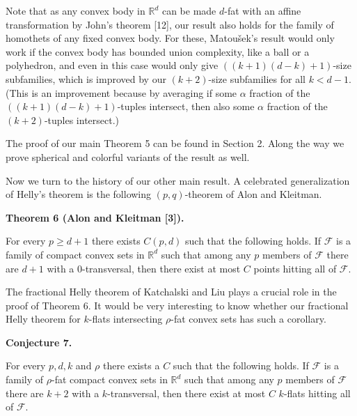 \documentclass[10pt,a4paper]{amsart}
\begin{document}
\par
\par
Note that as any convex body in $\mathbb{R}^{d}$ can be made $d$-fat with an affine transformation by John’s theorem [12], our result also holds for the family of homothets of any fixed convex body. For these, Matoušek’s result would only work if the convex body has bounded union complexity, like a ball or a polyhedron, and even in this case would only give $((k+1)(d-k)+1)$-size subfamilies, which is improved by our $(k+2)$-size subfamilies for all $k<d-1$. (This is an improvement because by averaging if some $\alpha$ fraction of the $((k+1)(d-k)+1)$-tuples intersect, then also some $\alpha$ fraction of the $(k+2)$-tuples intersect.)
\par
\par
The proof of our main Theorem 5 can be found in Section 2. Along the way we prove spherical and colorful variants of the result as well.
\par
\par
Now we turn to the history of our other main result. A celebrated generalization of Helly’s theorem is the following $(p,q)$-theorem of Alon and Kleitman.
\par
\par
\par\medskip\noindent\textbf{Theorem 6 (Alon and Kleitman [3]).}\par
For every $p\geq d+1$ there exists $C(p,d)$ such that the following holds. If $\mathcal{F}$ is a family of compact convex sets in $\mathbb{R}^{d}$ such that among any $p$ members of $\mathcal{F}$ there are $d+1$ with a $0$-transversal, then there exist at most $C$ points hitting all of $\mathcal{F}$.
\par
\par
\par
The fractional Helly theorem of Katchalski and Liu plays a crucial role in the proof of Theorem 6. It would be very interesting to know whether our fractional Helly theorem for $k$-flats intersecting $\rho$-fat convex sets has such a corollary.
\par
\par
\par\medskip\noindent\textbf{Conjecture 7.}\par
For every $p,d,k$ and $\rho$ there exists a $C$ such that the following holds. If $\mathcal{F}$ is a family of $\rho$-fat compact convex sets in $\mathbb{R}^{d}$ such that among any $p$ members of $\mathcal{F}$ there are $k+2$ with a $k$-transversal, then there exist at most $C$ $k$-flats hitting all of $\mathcal{F}$.
\end{document}
